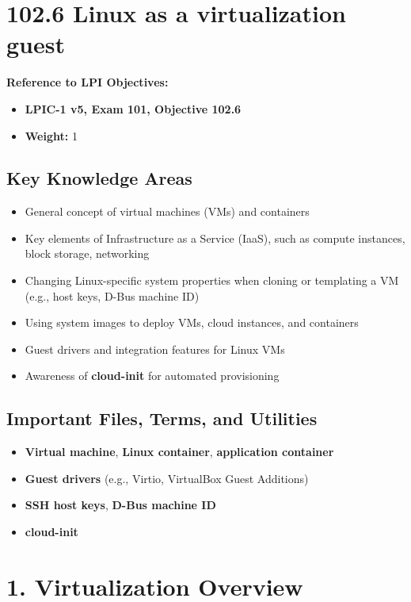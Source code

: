 \documentclass[a4paper]{report}
\begin{document}
\section*{102.6 Linux as a virtualization guest}



\textbf{Reference to LPI Objectives:}
\begin{itemize}
    \item \textbf{LPIC-1 v5, Exam 101, Objective 102.6}
    \item \textbf{Weight:} 1
\end{itemize}

\subsection*{Key Knowledge Areas}
\begin{itemize}
    \item General concept of virtual machines (VMs) and containers
    \item Key elements of Infrastructure as a Service (IaaS), such as compute instances, block storage, networking
    \item Changing Linux-specific system properties when cloning or templating a VM (e.g., host keys, D-Bus machine ID)
    \item Using system images to deploy VMs, cloud instances, and containers
    \item Guest drivers and integration features for Linux VMs
    \item Awareness of \textbf{cloud-init} for automated provisioning
\end{itemize}

\subsection*{Important Files, Terms, and Utilities}
\begin{itemize}
    \item \textbf{Virtual machine}, \textbf{Linux container}, \textbf{application container}
    \item \textbf{Guest drivers} (e.g., Virtio, VirtualBox Guest Additions)
    \item \textbf{SSH host keys}, \textbf{D-Bus machine ID}
    \item \textbf{cloud-init}
\end{itemize}

\section*{1. Virtualization Overview}
\end{document}

